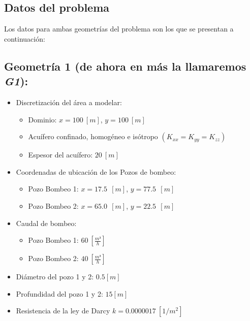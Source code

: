 \documentclass[10pt,a4paper,final]{article}
\begin{document}
\subsection{Datos del problema}
Los datos para ambas geometrías del problema son los que se presentan a continuación:
\label{datos_problema}
\subsection*{Geometría 1 (de ahora en más la llamaremos \emph{G1}): }
\label{geometria1}
\begin{itemize}
	\item Discretización del área a modelar:	
	\begin{itemize}
		\item Dominio: $x=100 ~\left[m\right]$, $y=100 ~\left[m\right]$
		\item Acuífero confinado, homogéneo e isótropo $(K_{xx} = K_{yy} = K_{zz})$
		\item Espesor del acuífero: $20 ~\left[m\right]$
	\end{itemize}
	\item Coordenadas de ubicación de los Pozos de bombeo:
	\begin{itemize}
		\item Pozo Bombeo 1: $x=17.5~~\left[m\right]$, $y=77.5 ~~\left[m\right]$
		\item Pozo Bombeo 2: $x=65.0~~\left[m\right]$, $y=22.5 ~~\left[m\right]$
	\end{itemize}
	\item Caudal de bombeo:
	\begin{itemize}
		\item Pozo Bombeo 1: $60~\left[\frac{m³}{h}\right]$
		\item Pozo Bombeo 2: $40~\left[\frac{m³}{h}\right]$
	\end{itemize}
	\item Diámetro del pozo 1 y 2: $0.5 [m]$
	\item Profundidad del pozo 1 y 2: $15 [m]$
	\item Resistencia de la ley de Darcy $k=0.0000017~[1/m^2]$
\end{itemize}
%
\end{document}
